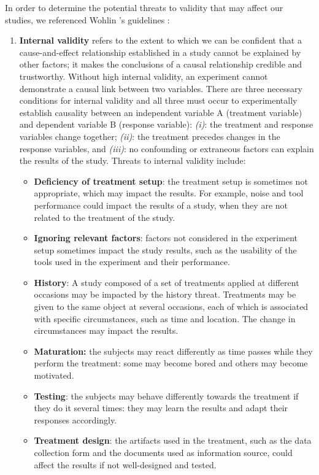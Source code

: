 In order to determine the potential threats to validity that may affect our studies, we referenced Wohlin \etal 's guidelines \cite{DBLP:books/sp/WohlinRHOR00}:
\begin{enumerate}
    \item \textbf{Internal validity} refers to the extent to which we can be confident that a cause-and-effect relationship established in a study cannot be explained by other factors; it makes the conclusions of a causal relationship credible and trustworthy. Without high internal validity, an experiment cannot demonstrate a causal link between two variables.
    There are three necessary conditions for internal validity and all three must occur to experimentally establish causality between an independent variable A (treatment variable) and dependent variable B (response variable): \textit{(i)}: the treatment and response variables change together; \textit{(ii)}: the treatment precedes changes in the response variables, and \textit{(iii)}: no confounding or extraneous factors can explain the results of the study.
    Threats to internal validity include: 
    \begin{itemize}
        \item \textbf{Deficiency of treatment setup}: the treatment setup is sometimes not appropriate, which may impact the results. For example, noise and tool performance could impact the results of a study, when they are not related to the treatment of the study.
        \item \textbf{Ignoring relevant factors}: factors not considered in the experiment setup sometimes impact the study results, such as the usability of the tools used in the experiment and their performance.
        \item \textbf{History}: A study composed of a set of treatments applied at different occasions may be impacted by the history threat. Treatments may be given to the same object at several occasions, each of which is associated with specific circumstances, such as time and location. The change in circumstances may impact the results.
        \item \textbf{Maturation:} the subjects may react differently as time passes while they perform the treatment: some may become bored and others may become motivated.
        \item \textbf{Testing}: the subjects may behave differently towards the treatment if they do it several times: they may learn the results and adapt their responses accordingly.
        \item \textbf{Treatment design}: the artifacts used in the treatment, such as the data collection form and the documents used as information source, could affect the results if not well-designed and tested.

\end{itemize}
\end{enumerate}

